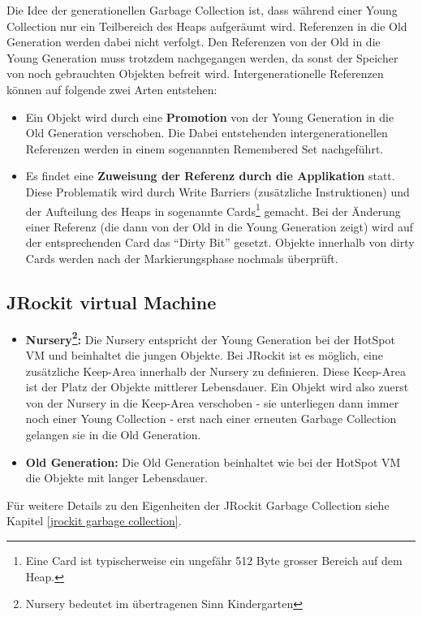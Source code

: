 Die Idee der generationellen Garbage Collection ist, dass während einer Young Collection nur ein Teilbereich des Heaps aufgeräumt wird. Referenzen in die Old Generation werden dabei nicht verfolgt. Den Referenzen von der Old in die Young Generation muss trotzdem nachgegangen werden, da sonst der Speicher von noch gebrauchten Objekten befreit wird. Intergenerationelle Referenzen können auf folgende zwei Arten entstehen:
\begin{itemize}
	\item Ein Objekt wird durch eine  \textbf{Promotion} von der Young Generation in die Old Generation verschoben. Die Dabei entstehenden intergenerationellen Referenzen werden in einem sogenannten Remembered Set nachgeführt. 
	\item Es findet eine \textbf{Zuweisung der Referenz durch die Applikation} statt. Diese Problematik wird durch Write Barriers (zusätzliche Instruktionen) und der Aufteilung des Heaps in sogenannte Cards\footnote{Eine Card ist typischerweise ein ungefähr 512 Byte grosser Bereich auf dem Heap.} gemacht. Bei der Änderung einer Referenz (die dann von der Old in die Young Generation zeigt) wird auf der entsprechenden Card das ``Dirty Bit'' gesetzt. Objekte innerhalb von dirty Cards werden nach der Markierungsphase nochmals überprüft.
\end{itemize}

\subsection{JRockit virtual Machine}
\begin{itemize}
	\item \textbf{Nursery\footnote{Nursery bedeutet im übertragenen Sinn Kindergarten}:} Die Nursery entspricht der Young Generation bei der HotSpot VM und beinhaltet die jungen Objekte. Bei JRockit ist es möglich, eine zusätzliche Keep-Area innerhalb der Nursery zu definieren. Diese Keep-Area ist der Platz der Objekte mittlerer Lebensdauer. Ein Objekt wird also zuerst von der Nursery in die Keep-Area verschoben - sie unterliegen dann immer noch einer Young Collection - erst nach einer erneuten Garbage Collection gelangen sie in die Old Generation.
	\item \textbf{Old Generation: } Die Old Generation beinhaltet wie bei der HotSpot VM die Objekte mit langer Lebensdauer.
\end{itemize}
Für weitere Details zu den Eigenheiten der JRockit Garbage Collection siehe Kapitel \ref{jrockit garbage collection}.


